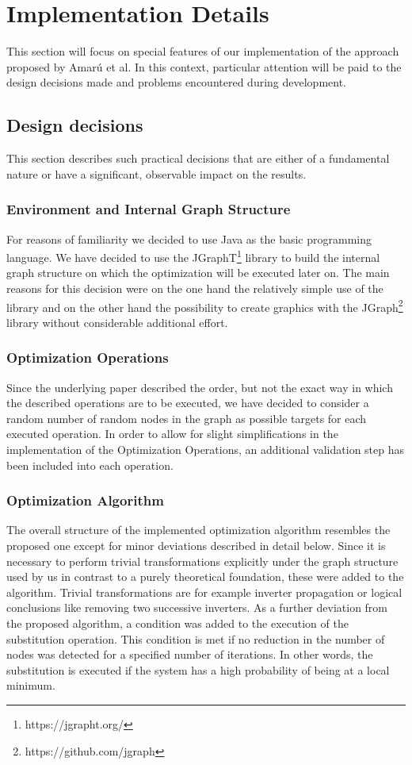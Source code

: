 \documentclass[
	accentcolor=1c,%
	type=intern,
	marginpar=false,
	ruledheaders=section,
	class=report,
	BCOR=5mm,
      parskip=half-,
	fontsize=10pt
	]{tudapub}
\begin{document}
	\newpage
	\section{Implementation Details}
	This section will focus on special features of our implementation of the approach proposed by Amarú et al.
	In this context, particular attention will be paid to the design decisions made and problems encountered during development.
	\subsection{Design decisions}
	This section describes such practical decisions that are either of a fundamental nature or have a significant, observable impact on the results.
		\subsubsection{Environment and Internal Graph Structure}
			For reasons of familiarity we decided to use Java as the basic programming language.
			We have decided to use the JGraphT\footnote{https://jgrapht.org/} library to build the internal graph structure on which the optimization will be executed later on.
			The main reasons for this decision were on the one hand the relatively simple use of the library and on the other hand the possibility to create graphics with the JGraph\footnote{https://github.com/jgraph} library without considerable additional effort.
		\subsubsection{Optimization Operations}
			Since the underlying paper described the order, but not the exact way in which the described operations are to be executed, we have decided to consider a random number of random nodes in the graph as possible targets for each executed operation.
			In order to allow for slight simplifications in the implementation of the Optimization Operations, an additional validation step has been included into each operation.
		\subsubsection{Optimization Algorithm}
			The overall structure of the implemented optimization algorithm resembles the proposed one except for minor deviations described in detail below.
			Since it is necessary to perform trivial transformations explicitly under the graph structure used by us in contrast to a purely theoretical foundation, these were added to the algorithm.
			Trivial transformations are for example inverter propagation or logical conclusions like removing two successive inverters.
			As a further deviation from the proposed algorithm, a condition was added to the execution of the substitution operation.
			This condition is met if no reduction in the number of nodes was detected for a specified number of iterations. In other words, the substitution is executed if the system has a high probability of being at a local minimum.
\end{document}

